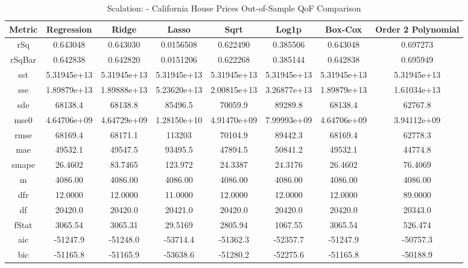 \documentclass{article}
\begin{document}
\begin{table}[H]
\centering
\caption{Scalation: - California House Prices Out-of-Sample QoF Comparison}
\label{tab:Scalation: - House Prices Out-of-Sample QoF Comparison}
\begin{tabular}{|c|c|c|c|c|c|c|c|} \hline 
Metric & Regression & Ridge & Lasso & Sqrt & Log1p & Box-Cox & Order 2 Polynomial \\ \hline \hline 
rSq &0.643048 & 0.643030 &      0.0156508 &     0.622490 &      0.385506 &      0.643048 &      0.697273 \\ \hline 
rSqBar &0.642838 &      0.642820 &      0.0151206 &     0.622268 &      0.385144 &      0.642838 &      0.695949 \\ \hline 
sst &5.31945e+13 &      5.31945e+13 &   5.31945e+13 &   5.31945e+13 &   5.31945e+13 &   5.31945e+13 &   5.31945e+13 \\ \hline 
sse &1.89879e+13 &      1.89888e+13 &   5.23620e+13 &   2.00815e+13 &   3.26877e+13 &   1.89879e+13 &   1.61034e+13 \\ \hline 
sde &68138.4 &  68138.8 &       85496.5 &       70059.9 &       89289.8 &       68138.4 &       62767.8 \\ \hline 
mse0 &4.64706e+09 &     4.64729e+09 &   1.28150e+10 &   4.91470e+09 &   7.99993e+09 &   4.64706e+09 &   3.94112e+09 \\ \hline 
rmse &68169.4 & 68171.1 &       113203 &        70104.9 &       89442.3 &       68169.4 &       62778.3 \\ \hline 
mae &49532.1 &  49547.5 &       93495.5 &       47894.5 &       50841.2 &       49532.1 &       44774.8 \\ \hline 
smape &26.4602 &        83.7465 &       123.972 &       24.3387 &       24.3176 &       26.4602 &       76.4069 \\ \hline 
m &4086.00 &    4086.00 &       4086.00 &       4086.00 &       4086.00 &       4086.00 &       4086.00 \\ \hline 
dfr &12.0000 &  12.0000 &       11.0000 &       12.0000 &       12.0000 &       12.0000 &       89.0000 \\ \hline 
df &20420.0 &   20420.0 &       20421.0 &       20420.0 &       20420.0 &       20420.0 &       20343.0 \\ \hline 
fStat &3065.54 &        3065.31 &       29.5169 &       2805.94 &       1067.55 &       3065.54 &       526.474 \\ \hline 
aic &-51247.9 & -51248.0 &      -53714.4 &      -51362.3 &      -52357.7 &      -51247.9 &      -50757.3 \\ \hline 
bic &-51165.8 & -51165.9 &      -53638.6 &      -51280.2 &      -52275.6 &      -51165.8 &      -50188.9 \\ \hline 
\end{tabular}
\end{table}
\end{document}
